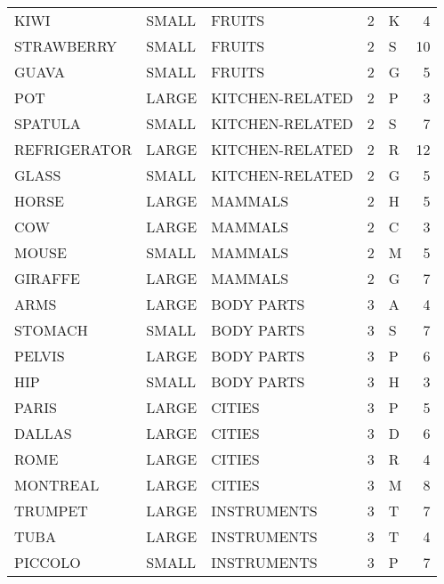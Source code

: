 \begin{tabular}{lllrlr}
        KIWI & SMALL &           FRUITS &        2 &            K &       4 \\
  STRAWBERRY & SMALL &           FRUITS &        2 &            S &      10 \\
       GUAVA & SMALL &           FRUITS &        2 &            G &       5 \\
         POT & LARGE &  KITCHEN-RELATED &        2 &            P &       3 \\
     SPATULA & SMALL &  KITCHEN-RELATED &        2 &            S &       7 \\
REFRIGERATOR & LARGE &  KITCHEN-RELATED &        2 &            R &      12 \\
       GLASS & SMALL &  KITCHEN-RELATED &        2 &            G &       5 \\
       HORSE & LARGE &          MAMMALS &        2 &            H &       5 \\
         COW & LARGE &          MAMMALS &        2 &            C &       3 \\
       MOUSE & SMALL &          MAMMALS &        2 &            M &       5 \\
     GIRAFFE & LARGE &          MAMMALS &        2 &            G &       7 \\
        ARMS & LARGE &       BODY PARTS &        3 &            A &       4 \\
     STOMACH & SMALL &       BODY PARTS &        3 &            S &       7 \\
      PELVIS & LARGE &       BODY PARTS &        3 &            P &       6 \\
         HIP & SMALL &       BODY PARTS &        3 &            H &       3 \\
       PARIS & LARGE &           CITIES &        3 &            P &       5 \\
      DALLAS & LARGE &           CITIES &        3 &            D &       6 \\
        ROME & LARGE &           CITIES &        3 &            R &       4 \\
    MONTREAL & LARGE &           CITIES &        3 &            M &       8 \\
     TRUMPET & LARGE &      INSTRUMENTS &        3 &            T &       7 \\
        TUBA & LARGE &      INSTRUMENTS &        3 &            T &       4 \\
     PICCOLO & SMALL &      INSTRUMENTS &        3 &            P &       7 \\

\end{tabular}
